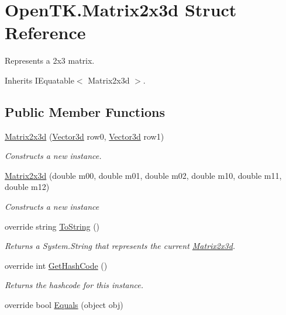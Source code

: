 \hypertarget{struct_open_t_k_1_1_matrix2x3d}{\section{Open\-T\-K.\-Matrix2x3d Struct Reference}
\label{struct_open_t_k_1_1_matrix2x3d}
}


Represents a 2x3 matrix.  




Inherits I\-Equatable$<$ Matrix2x3d $>$.

\subsection*{Public Member Functions}
\begin{DoxyCompactItemize}
\item 
\hyperlink{struct_open_t_k_1_1_matrix2x3d_ac6e0b7739e0bab80587e3b3203dd0d34}{Matrix2x3d} (\hyperlink{struct_open_t_k_1_1_vector3d}{Vector3d} row0, \hyperlink{struct_open_t_k_1_1_vector3d}{Vector3d} row1)
\begin{DoxyCompactList}\small\item\em Constructs a new instance. \end{DoxyCompactList}\item 
\hyperlink{struct_open_t_k_1_1_matrix2x3d_a17472227c37f8f9288e9e6ea0fad5ca9}{Matrix2x3d} (double m00, double m01, double m02, double m10, double m11, double m12)
\begin{DoxyCompactList}\small\item\em Constructs a new instance \end{DoxyCompactList}\item 
override string \hyperlink{struct_open_t_k_1_1_matrix2x3d_ae8675de36e28a5cacf021ce6a8ac7657}{To\-String} ()
\begin{DoxyCompactList}\small\item\em Returns a System.\-String that represents the current \hyperlink{struct_open_t_k_1_1_matrix2x3d}{Matrix2x3d}. \end{DoxyCompactList}\item 
override int \hyperlink{struct_open_t_k_1_1_matrix2x3d_ad9d26bb33f1480b75c1c83dc5945cbec}{Get\-Hash\-Code} ()
\begin{DoxyCompactList}\small\item\em Returns the hashcode for this instance. \end{DoxyCompactList}\item 
override bool \hyperlink{struct_open_t_k_1_1_matrix2x3d_ab4c73db4d901b0b4814f318c4a87b9b4}{Equals} (object obj)

\end{DoxyCompactItemize}
